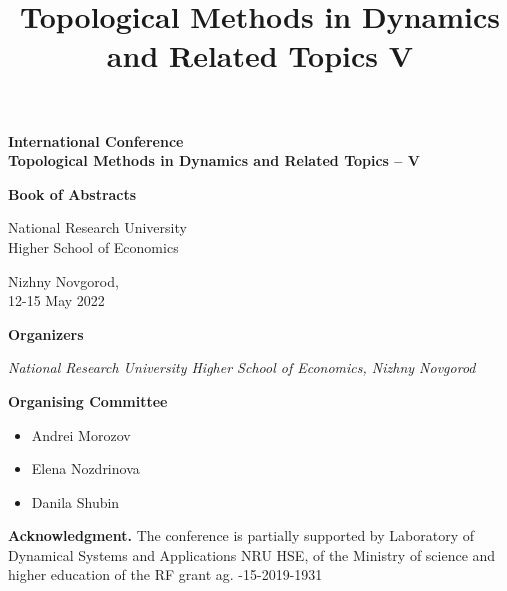 \documentclass[11pt]{article}
\date{}
\title{Topological Methods in Dynamics and Related Topics V}
\begin{document}
	\thispagestyle{empty}
	
	\begin{titlepage}
		\large
		\begin{center}
			{\bf\Large International Conference \\
				\smallskip
				Topological Methods in Dynamics and Related Topics – V}
		\end{center}
		\vspace*{2cm}
		
		
		\vspace{3.cm}
		
		\centerline{\bf\LARGE Book of Abstracts}
		
		
		\vspace{6cm}
		
		
		\begin{center}{\Large National Research University}\\ {\Large Higher School of Economics}\\
		\end{center}
		
		\vspace{3cm}
		
		\begin{center}{Nizhny Novgorod,\\ 12-15 May 2022}\end{center}
		
	\end{titlepage}
	
	{\Large\bf Organizers}
	
	\vspace{7mm}
	{\it
		National Research University Higher School of Economics, Nizhny Novgorod
	}
	\vspace{10mm}
	
	
	{\bf Organising Committee}
	\begin{itemize}
		\setlength{\itemsep}{1pt}%
		\setlength{\parskip}{1pt}
		\item Andrei Morozov
		\item Elena Nozdrinova
		\item Danila Shubin
	\end{itemize}
	
	
	{\bf Acknowledgment.} The conference is partially supported by Laboratory of Dynamical
	Systems and Applications NRU HSE, of the Ministry of science and higher education of
	the RF grant ag. -15-2019-1931
	
	\clearpage
	\setcounter{page}{2}
	\tableofcontents %
	\clearpage
	
\end{document}
